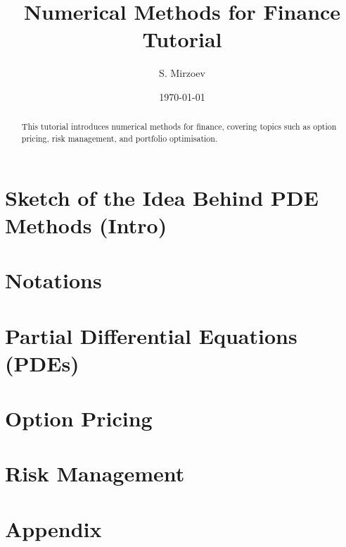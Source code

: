 \documentclass{article}
\title{Numerical Methods for Finance Tutorial}
\author{S. Mirzoev}
\date{\today}
\begin{document}
\maketitle

\begin{abstract}
This tutorial introduces numerical methods for finance, covering topics such as option pricing, risk management, and portfolio optimisation.
\end{abstract}

\section{Sketch of the Idea Behind PDE Methods (Intro)}


\section{Notations}


\section{Partial Differential Equations (PDEs)}


\section{Option Pricing}
% 

\section{Risk Management}
% 


\section{Appendix}

\end{document}
